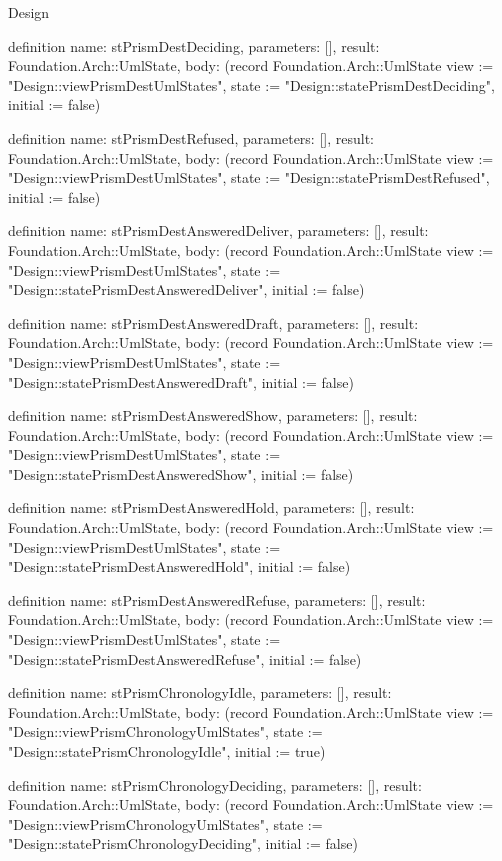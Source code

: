 \begin{lexlean}{Design}
\begin{semanticmodule}
definition{
  name: stPrismDestDeciding,
  parameters: [],
  result: Foundation.Arch::UmlState,
  body: (record Foundation.Arch::UmlState {view := "Design::viewPrismDestUmlStates", state := "Design::statePrismDestDeciding", initial := false})
}

definition{
  name: stPrismDestRefused,
  parameters: [],
  result: Foundation.Arch::UmlState,
  body: (record Foundation.Arch::UmlState {view := "Design::viewPrismDestUmlStates", state := "Design::statePrismDestRefused", initial := false})
}

definition{
  name: stPrismDestAnsweredDeliver,
  parameters: [],
  result: Foundation.Arch::UmlState,
  body: (record Foundation.Arch::UmlState {view := "Design::viewPrismDestUmlStates", state := "Design::statePrismDestAnsweredDeliver", initial := false})
}

definition{
  name: stPrismDestAnsweredDraft,
  parameters: [],
  result: Foundation.Arch::UmlState,
  body: (record Foundation.Arch::UmlState {view := "Design::viewPrismDestUmlStates", state := "Design::statePrismDestAnsweredDraft", initial := false})
}

definition{
  name: stPrismDestAnsweredShow,
  parameters: [],
  result: Foundation.Arch::UmlState,
  body: (record Foundation.Arch::UmlState {view := "Design::viewPrismDestUmlStates", state := "Design::statePrismDestAnsweredShow", initial := false})
}

definition{
  name: stPrismDestAnsweredHold,
  parameters: [],
  result: Foundation.Arch::UmlState,
  body: (record Foundation.Arch::UmlState {view := "Design::viewPrismDestUmlStates", state := "Design::statePrismDestAnsweredHold", initial := false})
}

definition{
  name: stPrismDestAnsweredRefuse,
  parameters: [],
  result: Foundation.Arch::UmlState,
  body: (record Foundation.Arch::UmlState {view := "Design::viewPrismDestUmlStates", state := "Design::statePrismDestAnsweredRefuse", initial := false})
}

definition{
  name: stPrismChronologyIdle,
  parameters: [],
  result: Foundation.Arch::UmlState,
  body: (record Foundation.Arch::UmlState {view := "Design::viewPrismChronologyUmlStates", state := "Design::statePrismChronologyIdle", initial := true})
}

definition{
  name: stPrismChronologyDeciding,
  parameters: [],
  result: Foundation.Arch::UmlState,
  body: (record Foundation.Arch::UmlState {view := "Design::viewPrismChronologyUmlStates", state := "Design::statePrismChronologyDeciding", initial := false})
}


\end{semanticmodule}
\end{lexlean}
